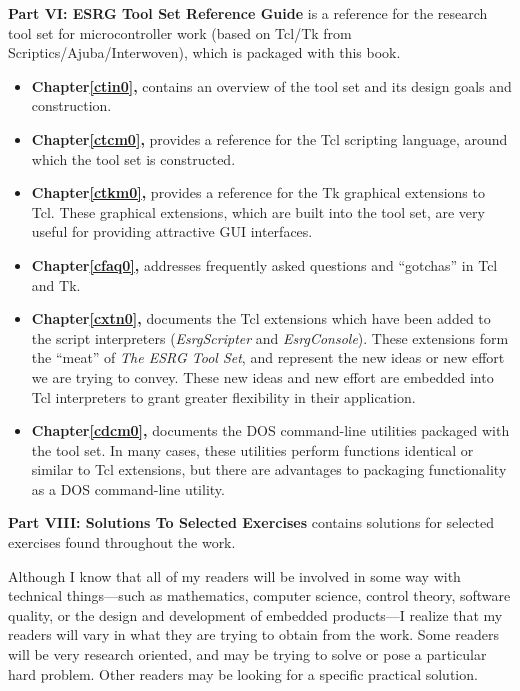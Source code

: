 \documentclass[letterpaper,10pt,titlepage]{custbook}
\begin{document}
\textbf{Part VI:  ESRG Tool Set Reference Guide}
is a reference for the research tool set for microcontroller 
work (based on Tcl/Tk from Scriptics/Ajuba/Interwoven), which is packaged
with this book.

\begin{itemize}
\item \textbf{Chapter\;\ref{ctin0}, \ctinzerotitle{}} contains an overview
      of the tool set and its design goals and construction.

\item \textbf{Chapter\;\ref{ctcm0}, \ctcmzerotitle{}} provides a reference
      for the Tcl scripting language, around which the tool set is constructed.

\item \textbf{Chapter\;\ref{ctkm0}, \ctkmzerotitle{}} provides a reference
      for the Tk graphical extensions to Tcl.  These graphical extensions,
	  which are built into the tool set, are very useful for providing
	  attractive GUI interfaces.

\item \textbf{Chapter\;\ref{cfaq0}, \cfaqzerotitle{}} addresses frequently
      asked questions and ``gotchas'' in Tcl and Tk.

\item \textbf{Chapter\;\ref{cxtn0}, \cxtnzerotitle{}} documents the Tcl
      extensions which have been added to the script interpreters
	  (\emph{EsrgScripter} and \emph{EsrgConsole}).  These extensions form the
	  ``meat'' of \emph{The ESRG Tool Set}, and represent the new ideas or
	  new effort we are trying to convey.  These new ideas and
      new effort are embedded into  Tcl interpreters to grant
	  greater flexibility in their application.

\item \textbf{Chapter\;\ref{cdcm0}, \cdcmzerotitle{}} documents the DOS command-line
      utilities packaged with the tool set.  In many cases, these utilities
	  perform functions identical or similar to Tcl extensions, but there are advantages to
	  packaging functionality as a DOS command-line utility.
\end{itemize}


\textbf{Part VIII:  Solutions To Selected Exercises}
contains solutions for selected exercises
found throughout the work.

Although  I
know that all of my readers will be involved in some way
with technical things---such as mathematics, computer science,
control theory, software quality, or the design and development
of embedded products---I realize that my readers will
vary in what they are trying to obtain from the work.  Some readers
will be very research oriented, and may be trying to solve or pose
a particular hard problem.
Other readers may be looking for a specific practical
solution.
\end{document}
